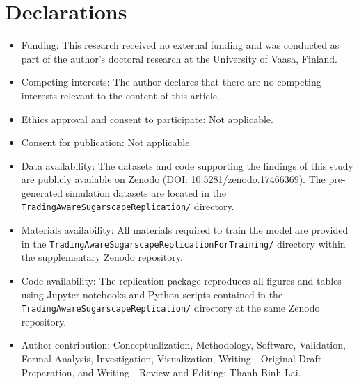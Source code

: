 \documentclass[pdflatex,sn-mathphys-num]{sn-jnl}%
\theoremstyle{thmstyleone}%
\theoremstyle{thmstyletwo}%
\theoremstyle{thmstylethree}%
\begin{document}
\section*{Declarations}

\begin{itemize}
\item Funding: This research received no external funding and was conducted as part of the author's doctoral research at the University of Vaasa, Finland.
\item Competing interests: The author declares that there are no competing interests relevant to the content of this article.
\item Ethics approval and consent to participate: Not applicable.
\item Consent for publication: Not applicable.
\item Data availability: The datasets and code supporting the findings of this study are publicly available on Zenodo (DOI: 10.5281/zenodo.17466369). 
  The pre-generated simulation datasets are located in the \texttt{TradingAwareSugarscapeReplication/} directory.
\item Materials availability:  All materials required to train the model are provided in the \texttt{TradingAwareSugarscapeReplicationForTraining/} directory within the supplementary Zenodo repository.
\item Code availability: The replication package reproduces all figures and tables using Jupyter notebooks and Python scripts contained in the \texttt{TradingAwareSugarscapeReplication/} directory at the same Zenodo repository.
\item Author contribution: Conceptualization, Methodology, Software, Validation, Formal Analysis, Investigation, Visualization, Writing---Original Draft Preparation, and Writing---Review and Editing: Thanh Binh Lai.
\end{itemize}


\end{document}
